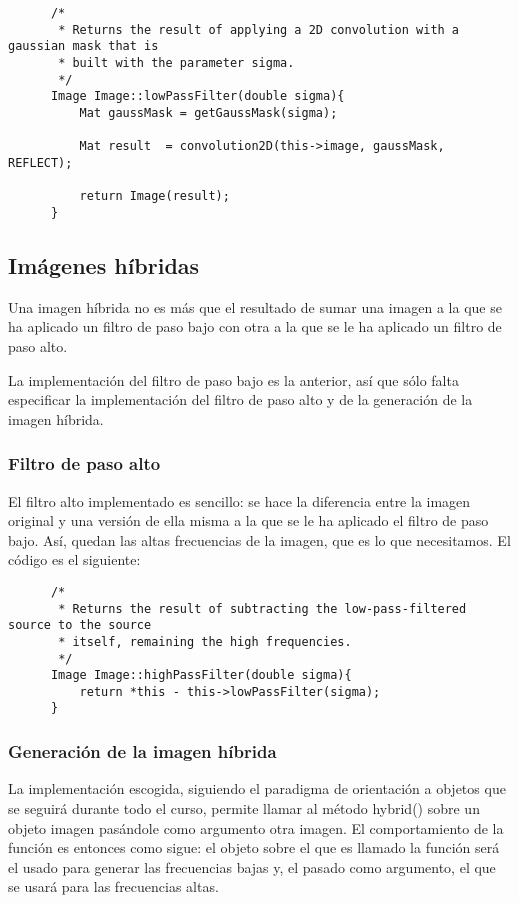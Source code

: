 \documentclass[a4paper, 11pt]{article}
\theoremstyle{definition}
\theoremstyle{theorem}
\begin{document}
  \begin{lstlisting}
      /*
       * Returns the result of applying a 2D convolution with a gaussian mask that is
       * built with the parameter sigma.
       */
      Image Image::lowPassFilter(double sigma){
          Mat gaussMask = getGaussMask(sigma);

          Mat result  = convolution2D(this->image, gaussMask, REFLECT);

          return Image(result);
      }
  \end{lstlisting}


  \subsection{Imágenes híbridas}
  Una imagen híbrida no es más que el resultado de sumar una imagen a la que se ha aplicado un filtro de paso bajo con otra a la que se le ha aplicado un filtro de paso alto.

  La implementación del filtro de paso bajo es la anterior, así que sólo falta especificar la implementación del filtro de paso alto y de la generación de la imagen híbrida.

  \subsubsection*{Filtro de paso alto}
  El filtro alto implementado es sencillo: se hace la diferencia entre la imagen original y una versión de ella misma a la que se le ha aplicado el filtro de paso bajo. Así, quedan las altas frecuencias de la imagen, que es lo que necesitamos. El código es el siguiente:

  \begin{lstlisting}
      /*
       * Returns the result of subtracting the low-pass-filtered source to the source
       * itself, remaining the high frequencies.
       */
      Image Image::highPassFilter(double sigma){
          return *this - this->lowPassFilter(sigma);
      }
  \end{lstlisting}

  \subsubsection{Generación de la imagen híbrida}
  La implementación escogida, siguiendo el paradigma de orientación a objetos que se seguirá durante todo el curso, permite llamar al método hybrid() sobre un objeto imagen pasándole como argumento otra imagen. El comportamiento de la función es entonces como sigue: el objeto sobre el que es llamado la función será el usado para generar las frecuencias bajas y, el pasado como argumento, el que se usará para las frecuencias altas.
\end{document}
